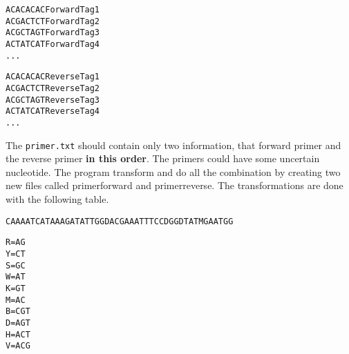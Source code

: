 \documentclass{article}\usepackage[]{graphicx}\usepackage[]{color}
\makeatletter
\newcommand{\hlstd}[1]{\textcolor[rgb]{0.345,0.345,0.345}{#1}}%
\newcommand{\hlkwb}[1]{\textcolor[rgb]{0.69,0.353,0.396}{#1}}%
\newenvironment{kframe}{%
 \def\at@end@of@kframe{}%
 \ifinner\ifhmode%
  \def\at@end@of@kframe{\end{minipage}}%
  \begin{minipage}{\columnwidth}%
 \fi\fi%
 \def\FrameCommand##1{\hskip\@totalleftmargin \hskip-\fboxsep
 \colorbox{shadecolor}{##1}\hskip-\fboxsep
     \hskip-\linewidth \hskip-\@totalleftmargin \hskip\columnwidth}%
 \MakeFramed {\advance\hsize-\width
   \@totalleftmargin\z@ \linewidth\hsize
   \@setminipage}}%
 {\par\unskip\endMakeFramed%
 \at@end@of@kframe}
\newenvironment{knitrout}{}{} %
\makeatother
\begin{document}
\begin{knitrout}
\color{fgcolor}\begin{kframe}
\begin{alltt}
ACACACAC	ForwardTag1
ACGACTCT	ForwardTag2
ACGCTAGT	ForwardTag3
ACTATCAT	ForwardTag4
...
\end{alltt}
\end{kframe}
\end{knitrout}

\begin{knitrout}
\color{fgcolor}\begin{kframe}
\begin{alltt}
ACACACAC	ReverseTag1
ACGACTCT	ReverseTag2
ACGCTAGT	ReverseTag3
ACTATCAT	ReverseTag4
...
\end{alltt}
\end{kframe}
\end{knitrout}


The \texttt{primer.txt} should contain only two information, that forward primer and the reverse primer \textbf{in this order}.
The primers could have some uncertain nucleotide. The program transform and do all the combination by creating two new files called primerforward and primerreverse. The transformations are done with the following table.

\begin{knitrout}
\color{fgcolor}\begin{kframe}
\begin{alltt}
CAAAATCATAAAGATATTGGDAC	GAAATTTCCDGGDTATMGAATGG
\end{alltt}
\end{kframe}
\end{knitrout}

\begin{knitrout}
\color{fgcolor}\begin{kframe}
\begin{alltt}
\hlstd{R} \hlkwb{=} \hlstd{AG}
\hlstd{Y} \hlkwb{=} \hlstd{CT}
\hlstd{S} \hlkwb{=} \hlstd{GC}
\hlstd{W} \hlkwb{=} \hlstd{AT}
\hlstd{K} \hlkwb{=} \hlstd{GT}
\hlstd{M} \hlkwb{=} \hlstd{AC}
\hlstd{B} \hlkwb{=} \hlstd{CGT}
\hlstd{D} \hlkwb{=} \hlstd{AGT}
\hlstd{H} \hlkwb{=} \hlstd{ACT}
\hlstd{V} \hlkwb{=} \hlstd{ACG}
\end{alltt}
\end{kframe}
\end{knitrout}
\end{document}
